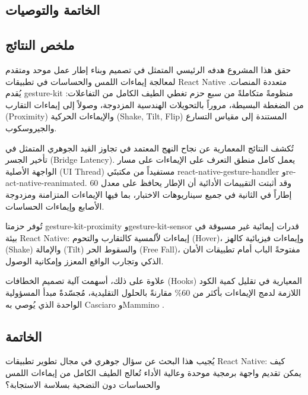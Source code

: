 \begin{Arabic}
\chapter{الخاتمة والتوصيات}
\clearpage

\section{ملخص النتائج}

حقق هذا المشروع هدفه الرئيسي المتمثل في تصميم وبناء إطار عمل موحد ومتقدم لمعالجة إيماءات اللمس والحساسات في تطبيقات \textenglish{React Native} متعددة المنصات. يُقدم \textenglish{gesture-kit} منظومةً متكاملةً من سبع حزم تغطي الطيف الكامل من التفاعلات: من الضغطة البسيطة، مروراً بالتحويلات الهندسية المزدوجة، وصولاً إلى إيماءات التقارب (\textenglish{Proximity}) والإيماءات الحركية (\textenglish{Shake, Tilt, Flip}) المستندة إلى مقياس التسارع والجيروسكوب.

تُكشف النتائج المعمارية عن نجاح النهج المعتمد في تجاوز القيد الجوهري المتمثل في تأخير الجسر (\textenglish{Bridge Latency}). يعمل كامل منطق التعرف على الإيماءات على مسار الواجهة الأصلية (\textenglish{UI Thread}) مستفيداً من مكتبتَي \textenglish{react-native-gesture-handler} و\textenglish{react-native-reanimated}. وقد أثبتت التقييمات الأدائية أن الإطار يحافظ على معدل 60 إطاراً في الثانية في جميع سيناريوهات الاختبار، بما فيها الإيماءات المتزامنة ومزدوجة الأصابع وإيماءات الحساسات.

تُوفر حزمتا \textenglish{gesture-kit-proximity} و\textenglish{gesture-kit-sensor} قدرات إيمائية غير مسبوقة في بيئة \textenglish{React Native}: إيماءات لاّلمسية كالتقارب والتحوم (\textenglish{Hover})، وإيماءات فيزيائية كالهز (\textenglish{Shake}) والإمالة (\textenglish{Tilt}) والسقوط الحر (\textenglish{Free Fall})، مفتوحةً الباب أمام تطبيقات الأمان الذكي وتجارب الواقع المعزز وإمكانية الوصول.

علاوة على ذلك، أسهمت آلية تصميم الخطافات (\textenglish{Hooks}) المعيارية في تقليل كمية الكود اللازمة لدمج الإيماءات بأكثر من 60\% مقارنةً بالحلول التقليدية، مُجسّدةً مبدأ المسؤولية الواحدة الذي يُوصي به \textenglish{Casciaro} و\textenglish{Mammino} \cite{casciaro2020}.

\section{الخاتمة}

يُجيب هذا البحث عن سؤال جوهري في مجال تطوير تطبيقات \textenglish{React Native}: كيف يمكن تقديم واجهة برمجية موحدة وعالية الأداء تُعالج الطيف الكامل من إيماءات اللمس والحساسات دون التضحية بسلاسة الاستجابة؟


\end{Arabic}
